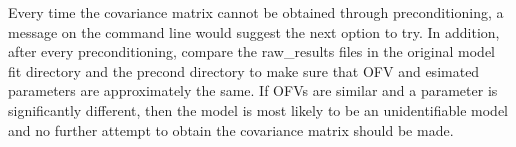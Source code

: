 Every time the covariance matrix cannot be obtained through preconditioning, a message on the command line would suggest the next option to try.  In addition, after every preconditioning, compare the raw\_results files in the original model fit directory and the precond directory to make sure that OFV and esimated parameters are approximately the same.  If OFVs are similar and a parameter is significantly different, then the model is most likely to be an unidentifiable model and no further attempt to obtain the covariance matrix should be made.


%
%
%
%    
